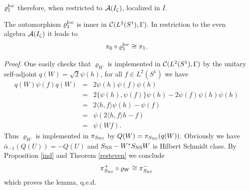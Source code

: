 \documentclass[10pt,a4paper]{article}
\begin{document}
$\varrho_1^{\rm loc}$ therefore, when restricted to
${\cal A}(I_\zeta)$, localized in $I$.
\begin{lemma}
The automorphism $\varrho_1^{\rm loc}$ is inner in
${\cal C}(L^2(S^1),\Gamma)$. In restriction to the
even algebra ${\cal A}(I_\zeta)$ it leads to
\begin{equation}
\pi_0\circ\varrho_1^{\rm loc} \cong \pi_1.
\end{equation}
\end{lemma}
{\it Proof.} One easily checks that $\varrho_W$ is
implemented in ${\cal C}(L^2(S^1),\Gamma)$ by the
unitary self-adjoint $q(W)=\sqrt{2}\psi(h)$, for all
$f\in L^2(S^1)$ we have
\begin{eqnarray*}
q(W)\psi(f)q(W)
&=& 2\psi(h)\psi(f)\psi(h) \\
&=& 2\{\psi(h),\psi(f)\}\psi(h) - 2\psi(f)\psi(h)\psi(h) \\
&=& 2\langle h,f \rangle \psi(h)  - \psi(f) \\
&=& \psi( 2\langle h, f \rangle h - f)  \\
&=& \psi(Wf).
\end{eqnarray*}
Thus $\varrho_W$ is implemented in $\pi_{S_{\rm NS}}$ by
$Q(W)=\pi_{S_{\rm NS}}(q(W))$. Obviously we have
$\bar{\alpha}_{-1}(Q(U))=-Q(U)$ and $S_{\rm NS}-W^*S_{\rm NS}W$
is Hilbert Schmidt class. By Proposition \ref{ind} and
Theorem \ref{resteven} we conclude
\[ \pi_{S_{\rm NS}}^+\circ\varrho_W \cong \pi_{S_{\rm NS}}^- \]
which proves the lemma, q.e.d.
\end{document}
